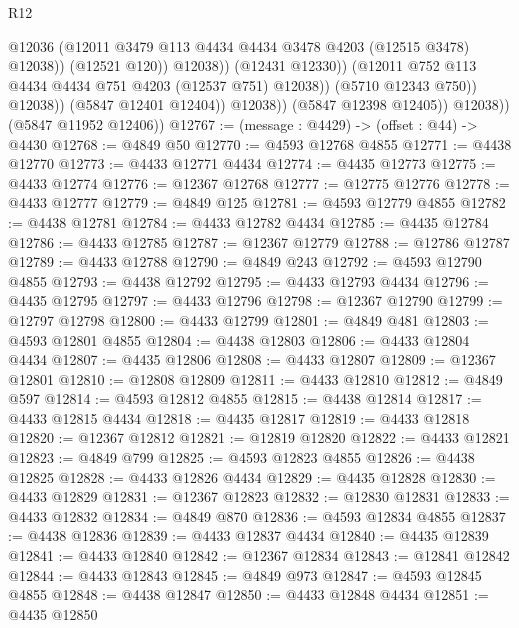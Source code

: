 \begin{lexlean}{R12}
\begin{coremodule}
                                    @12036
                                    (@12011
                                      @3479
                                      @113
                                      @4434
                                      @4434
                                      @3478
                                      @4203
                                      (@12515 @3478)
                                      @12038))
                                  (@12521 @120))
                                @12038))
                            (@12431 @12330))
                          (@12011 @752 @113 @4434 @4434 @751 @4203 (@12537 @751) @12038))
                        (@5710 @12343 @750))
                      @12038))
                  (@5847 @12401 @12404))
                @12038))
            (@5847 @12398 @12405))
          @12038))
      (@5847 @11952 @12406))
@12767 := (message : @4429) -> (offset : @44) -> @4430
@12768 := @4849 @50
@12770 := @4593 @12768 @4855
@12771 := @4438 @12770
@12773 := @4433 @12771 @4434
@12774 := @4435 @12773
@12775 := @4433 @12774
@12776 := @12367 @12768
@12777 := @12775 @12776
@12778 := @4433 @12777
@12779 := @4849 @125
@12781 := @4593 @12779 @4855
@12782 := @4438 @12781
@12784 := @4433 @12782 @4434
@12785 := @4435 @12784
@12786 := @4433 @12785
@12787 := @12367 @12779
@12788 := @12786 @12787
@12789 := @4433 @12788
@12790 := @4849 @243
@12792 := @4593 @12790 @4855
@12793 := @4438 @12792
@12795 := @4433 @12793 @4434
@12796 := @4435 @12795
@12797 := @4433 @12796
@12798 := @12367 @12790
@12799 := @12797 @12798
@12800 := @4433 @12799
@12801 := @4849 @481
@12803 := @4593 @12801 @4855
@12804 := @4438 @12803
@12806 := @4433 @12804 @4434
@12807 := @4435 @12806
@12808 := @4433 @12807
@12809 := @12367 @12801
@12810 := @12808 @12809
@12811 := @4433 @12810
@12812 := @4849 @597
@12814 := @4593 @12812 @4855
@12815 := @4438 @12814
@12817 := @4433 @12815 @4434
@12818 := @4435 @12817
@12819 := @4433 @12818
@12820 := @12367 @12812
@12821 := @12819 @12820
@12822 := @4433 @12821
@12823 := @4849 @799
@12825 := @4593 @12823 @4855
@12826 := @4438 @12825
@12828 := @4433 @12826 @4434
@12829 := @4435 @12828
@12830 := @4433 @12829
@12831 := @12367 @12823
@12832 := @12830 @12831
@12833 := @4433 @12832
@12834 := @4849 @870
@12836 := @4593 @12834 @4855
@12837 := @4438 @12836
@12839 := @4433 @12837 @4434
@12840 := @4435 @12839
@12841 := @4433 @12840
@12842 := @12367 @12834
@12843 := @12841 @12842
@12844 := @4433 @12843
@12845 := @4849 @973
@12847 := @4593 @12845 @4855
@12848 := @4438 @12847
@12850 := @4433 @12848 @4434
@12851 := @4435 @12850

\end{coremodule}
\end{lexlean}
